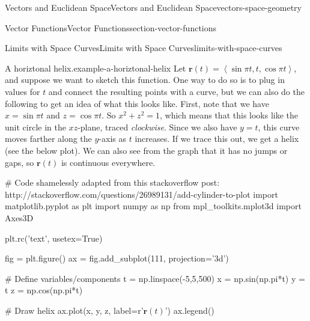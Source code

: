 \documentclass[oneside,10pt,]{book}
\numberwithin{equation}{section}
\newcommand{\vv}[1]{\mathbf{#1}}
\newcommand{\dotprod}[1]{\left\langle #1 \right\rangle}
\begin{document}
\begin{chapterptx}{Vectors and Euclidean Space}{}{Vectors and Euclidean Space}{}{}{vectors-space-geometry}
\begin{sectionptx}{Vector Functions}{}{Vector Functions}{}{}{section-vector-functions}
\begin{subsectionptx}{Limits with Space Curves}{}{Limits with Space Curves}{}{}{limits-with-space-curves}
\begin{example}{A horiztonal helix.}{example-a-horiztonal-helix}
\hypertarget{p-1257}{}%
Let \(\vv{r}(t) = \dotprod{\sin\pi t, t, \cos\pi t}\), and suppose we want to sketch this function. One way to do so is to plug in values for \(t\) and connect the resulting points with a curve, but we can also do the following to get an idea of what this looks like. First, note that we have \(x = \sin\pi t\) and \(z=\cos\pi t\). So \(x^{2}+z^{2} = 1\), which means that this looks like the unit circle in the \(xz\)-plane, traced \emph{clockwise}. Since we also have \(y=t\), this curve moves farther along the \(y\)-axis as \(t\) increases. If we trace this out, we get a helix (see the below plot). We can also see from the graph that it has no jumps or gaps, so \(\vv{r}(t)\) is continuous everywhere.%
\end{example}
\begin{sageinput}
# Code shamelessly adapted from this stackoverflow post: http://stackoverflow.com/questions/26989131/add-cylinder-to-plot
import matplotlib.pyplot as plt
import numpy as np
from mpl_toolkits.mplot3d import Axes3D

plt.rc('text', usetex=True)

fig = plt.figure()
ax = fig.add_subplot(111, projection='3d')

# Define variables/components
t = np.linspace(-5,5,500)
x = np.sin(np.pi*t)
y = t
z = np.cos(np.pi*t)

# Draw helix
ax.plot(x, y, z, label=r'$\mathbf{r}(t)$')
ax.legend()


\end{sageinput}
\end{subsectionptx}
\end{sectionptx}
\end{chapterptx}
\end{document}
